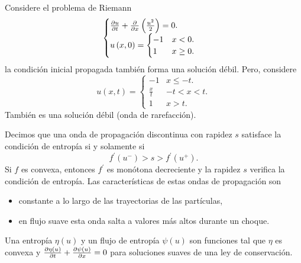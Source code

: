 \begin{example}
	Considere el problema de Riemann
	\begin{equation*}
		\begin{cases}
			\diffp{u}{t}+
			\diffp{}{x}
			\left(\frac{u^{2}}{2}\right)=
			0. \\
			u\left(x,0\right)=
			\begin{cases}
				-1 & x < 0.    \\
				1  & x \geq 0.
			\end{cases}
		\end{cases}
	\end{equation*}
	la condición inicial propagada también forma una solución débil.
	Pero, considere
	\begin{equation*}
		u\left(x,t\right)=
		\begin{cases}
			-1          & x \leq -t.  \\
			\frac{x}{t} & -t < x < t. \\
			1           & x > t.
		\end{cases}
	\end{equation*}
	También es una solución débil (onda de rarefacción).
\end{example}

Decimos que una onda de propagación discontinua con rapidez $s$
satisface la condición de entropía si y solamente si
\begin{equation*}
	f^{\prime}\left(u^{-}\right)>s>f^{\prime}\left(u^{+}\right).
\end{equation*}
Si $f$ es convexa, entonces $f^{\prime}$ es monótona decreciente y la rapidez
$s$ verifica la condición de entropía.
Las características de estas ondas de propagación son
\begin{itemize}
	\item

	      constante a lo largo de las trayectorias de las partículas,

	\item

	      en flujo suave esta onda salta a valores más altos durante un
	      choque.
\end{itemize}

\begin{definition}
	Una entropía $\eta\left(u\right)$ y un flujo de entropía
	$\psi\left(u\right)$ son funciones tal que $\eta$ es convexa y
	\begin{math}
		\diffp{\eta\left(u\right)}{t}+
		\diffp{\psi\left(u\right)}{x}=
		0
	\end{math}
	para soluciones suaves de una ley de conservación.
\end{definition}

